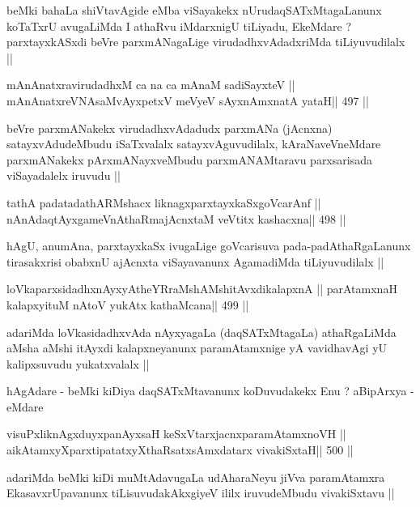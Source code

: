 \begin{artha}
beMki bahaLa shiVtavAgide eMba viSayakekx nUrudaqSATxMtagaLanunx
koTaTxrU avugaLiMda I athaRvu iMdarxnigU tiLiyadu, EkeMdare ?
parxtayxkASxdi beVre parxmANagaLige virudadhxvAdadxriMda
tiLiyuvudilalx ||
\end{artha}

\begin{shl}
mAnAnatxravirudadhxM ca na ca mAnaM sadiSayxteV ||
mAnAnatxreVNAsaMvAyxpetxV meVyeV sAyxnAmxnatA yataH\hfill || 497 ||
\end{shl}

\begin{artha}
beVre parxmANakekx virudadhxvAdadudx parxmANa (jAcnxna)
satayxvAdudeMbudu iSaTxvalalx satayxvAguvudilalx, kAraNaveVneMdare
parxmANakekx pArxmANayxveMbudu parxmANAMtaravu parxsarisada
viSayadalelx iruvudu ||
\end{artha}

\begin{shl}
tathA padatadathARMshacx liknagxparxtayxkaSxgoVcarAnf ||
nAnAdaqtAyx\s\s gameVnAthaRmajAcnxtaM veVtitx kashacxna\hfill || 498 ||
\end{shl}

\begin{artha}
hAgU, anumAna, parxtayxkaSx ivugaLige goVcarisuva
pada-padAthaRgaLanunx tirasakxrisi obabxnU ajAcnxta viSayavanunx
AgamadiMda tiLiyuvudilalx ||
\end{artha}

\begin{shl}
loVkaparxsidadhxnAyxyAtheYRraMshAMshitAvxdikalapxnA ||
parAtamxnaH kalapxyituM nAtoV yukAtx kathaMcana\hfill || 499 ||
\end{shl}

\begin{artha}
adariMda loVkasidadhxvAda nAyxyagaLa (daqSATxMtagaLa) athaRgaLiMda
aMsha aMshi itAyxdi kalapxneyanunx paramAtamxnige yA vavidhavAgi yU
kalipxsuvudu yukatxvalalx ||

hAgAdare - beMki kiDiya daqSATxMtavanunx koDuvudakekx Enu ? aBipArxya
- eMdare 
\end{artha}

\begin{shl}
visuPxliknAgxduyxpanAyxsaH keSxVtarxjacnxparamAtamxnoVH ||
aikAtamxyXparxtipatatxyXthaRsatxsAmxdatarx vivakiSxtaH\hfill || 500 ||
\end{shl}

\begin{artha}
adariMda beMki kiDi muMtAdavugaLa udAharaNeyu jiVva paramAtamxra
EkasavxrUpavanunx tiLisuvudakAkxgiyeV ililx iruvudeMbudu vivakiSxtavu ||
\end{artha}

